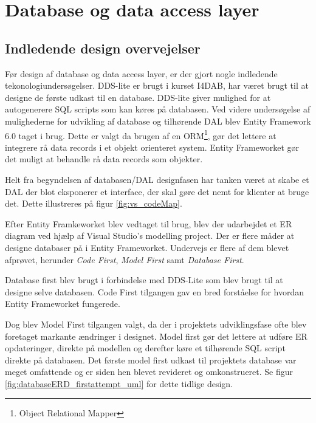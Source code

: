 \section{Database og data access layer}

\subsection{Indledende design overvejelser}
Før design af database og data access layer, er der gjort nogle indledende tekonologiundersøgelser. DDS-lite er brugt i kurset I4DAB, har været brugt til at designe de første udkast til en database. DDS-lite giver mulighed for at autogenerere SQL scripts som kan køres på databasen. Ved videre undersøgelse af mulighederne for udvikling af database og tilhørende DAL blev Entity Framework 6.0 taget i brug. Dette er valgt da brugen af en ORM\footnote{Object Relational Mapper}, gør det lettere at integrere rå data records i et objekt orienteret system. Entity Frameworket gør det muligt at behandle rå data records som objekter. 

Helt fra begyndelsen af databasen/DAL designfasen har tanken været at skabe et DAL der blot eksponerer et interface, der skal gøre det nemt for klienter at bruge det. Dette illustreres på figur \ref{fig:vs_codeMap}.

Efter Entity Framkeworket blev vedtaget til brug, blev der udarbejdet et ER diagram ved hjælp af Visual Studio's modelling project. Der er flere måder at designe databaser på i Entity Frameworket. Undervejs er flere af dem blevet afprøvet, herunder \textit{Code First}, \textit{Model First} samt \textit{Database First}.

Database first blev brugt i forbindelse med DDS-Lite som blev brugt til at designe selve databasen. Code First tilgangen gav en bred forståelse for hvordan Entity Frameworket fungerede.

Dog blev Model First tilgangen valgt, da der i projektets udviklingsfase ofte blev foretaget markante ændringer i designet. Model first gør det lettere at udføre ER opdateringer, direkte på modellen og derefter køre et tilhørende SQL script direkte på databasen. Det første model first udkast til projektets database var meget omfattende og er siden hen blevet revideret og omkonstrueret. Se figur \ref{fig:databaseERD_firstattempt_uml} for dette tidlige design.

